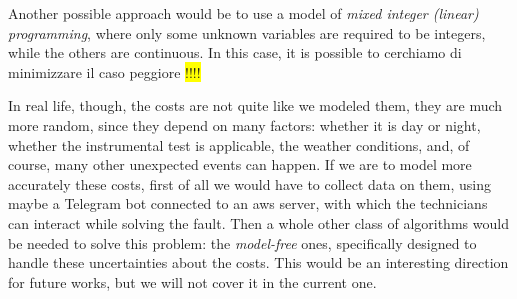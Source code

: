 Another possible approach would be to use a model of \emph{mixed integer (linear) programming}, where only some unknown variables are required to be integers, while the others are continuous. In this case, it is possible to cerchiamo di minimizzare il caso peggiore \colorbox{yellow}{!!!!}

In real life, though, the costs are not quite like we modeled them, they are much more random, since they depend on many factors: whether it is day or night, whether the instrumental test is applicable, the weather conditions, and, of course, many other unexpected events can happen. If we are to model more accurately these costs, first of all we would have to collect data on them, using maybe a Telegram bot connected to an \acrshort{aws} server, with which the technicians can interact while solving the fault. Then a whole other class of algorithms would be needed to solve this problem: the \emph{model-free} ones, specifically designed to handle these uncertainties about the costs. This would be an interesting direction for future works, but we will not cover it in the current one.